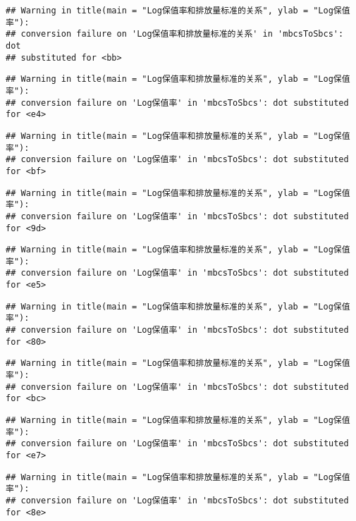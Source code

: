 \documentclass[]{article}
\begin{document}
\begin{verbatim}
## Warning in title(main = "Log保值率和排放量标准的关系", ylab = "Log保值率"):
## conversion failure on 'Log保值率和排放量标准的关系' in 'mbcsToSbcs': dot
## substituted for <bb>
\end{verbatim}

\begin{verbatim}
## Warning in title(main = "Log保值率和排放量标准的关系", ylab = "Log保值率"):
## conversion failure on 'Log保值率' in 'mbcsToSbcs': dot substituted for <e4>
\end{verbatim}

\begin{verbatim}
## Warning in title(main = "Log保值率和排放量标准的关系", ylab = "Log保值率"):
## conversion failure on 'Log保值率' in 'mbcsToSbcs': dot substituted for <bf>
\end{verbatim}

\begin{verbatim}
## Warning in title(main = "Log保值率和排放量标准的关系", ylab = "Log保值率"):
## conversion failure on 'Log保值率' in 'mbcsToSbcs': dot substituted for <9d>
\end{verbatim}

\begin{verbatim}
## Warning in title(main = "Log保值率和排放量标准的关系", ylab = "Log保值率"):
## conversion failure on 'Log保值率' in 'mbcsToSbcs': dot substituted for <e5>
\end{verbatim}

\begin{verbatim}
## Warning in title(main = "Log保值率和排放量标准的关系", ylab = "Log保值率"):
## conversion failure on 'Log保值率' in 'mbcsToSbcs': dot substituted for <80>
\end{verbatim}

\begin{verbatim}
## Warning in title(main = "Log保值率和排放量标准的关系", ylab = "Log保值率"):
## conversion failure on 'Log保值率' in 'mbcsToSbcs': dot substituted for <bc>
\end{verbatim}

\begin{verbatim}
## Warning in title(main = "Log保值率和排放量标准的关系", ylab = "Log保值率"):
## conversion failure on 'Log保值率' in 'mbcsToSbcs': dot substituted for <e7>
\end{verbatim}

\begin{verbatim}
## Warning in title(main = "Log保值率和排放量标准的关系", ylab = "Log保值率"):
## conversion failure on 'Log保值率' in 'mbcsToSbcs': dot substituted for <8e>
\end{verbatim}
\end{document}
